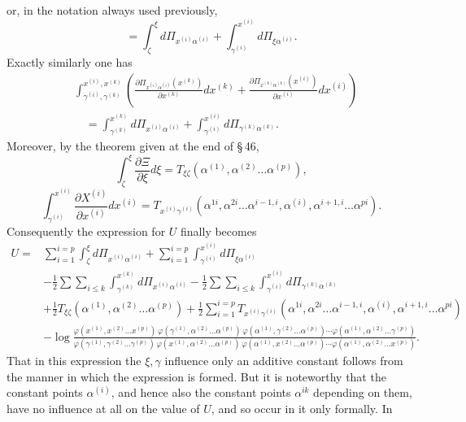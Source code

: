 \documentclass[10pt]{article}
\begin{document}
\endgroup
or, in the notation always used previously,
\[
=\int_{\zeta}^{\xi}d\Pi_{x^{(i)}\alpha^{(i)}}+
\int_{\gamma^{(i)}}^{x^{(i)}}d\Pi_{\xi\alpha^{(i)}}.
\]
Exactly similarly one has
\begingroup\footnotesize
\[
\begin{aligned}
&\int_{\gamma^{(i)},\gamma^{(k)}}^{x^{(i)},x^{(k)}}
\left(\frac{\partial\Pi_{x^{(i)}\alpha^{(i)}}(x^{(k)})}{\partial x^{(k)}}dx^{(k)}
+\frac{\partial\Pi_{x^{(k)}\alpha^{(k)}}(x^{(i)})}{\partial x^{(i)}}dx^{(i)}\right)\\
&\quad=\int_{\gamma^{(k)}}^{x^{(k)}}d\Pi_{x^{(i)}\alpha^{(i)}}+
\int_{\gamma^{(i)}}^{x^{(i)}}d\Pi_{\gamma^{(k)}\alpha^{(k)}}.
\end{aligned}
\]
\endgroup
Moreover, by the theorem given at the end of \S\,46,
\[
\int_{\zeta}^{\xi}\frac{\partial\Xi}{\partial\xi}d\xi
=T_{\xi\zeta}(\alpha^{(1)},\alpha^{(2)}\ldots\alpha^{(p)}),
\]
\[
\int_{\gamma^{(i)}}^{x^{(i)}}\frac{\partial X^{(i)}}{\partial x^{(i)}}dx^{(i)}
=T_{x^{(i)}\gamma^{(i)}}(\alpha^{1i},\alpha^{2i}\ldots\alpha^{i-1,i},\alpha^{(i)},\alpha^{i+1,i}\ldots\alpha^{pi}).
\]
Consequently the expression for \(U\) finally becomes
\begingroup\scriptsize
\[
\begin{aligned}
U={}&\sum_{i=1}^{i=p}\int_{\zeta}^{\xi}d\Pi_{x^{(i)}\alpha^{(i)}}
+\sum_{i=1}^{i=p}\int_{\gamma^{(i)}}^{x^{(i)}}d\Pi_{\xi\alpha^{(i)}}\\
&-\frac12\sum\sum_{i\le k}\int_{\gamma^{(k)}}^{x^{(k)}}d\Pi_{x^{(i)}\alpha^{(i)}}
-\frac12\sum\sum_{i\le k}\int_{\gamma^{(i)}}^{x^{(i)}}d\Pi_{\gamma^{(k)}\alpha^{(k)}}\\
&+\frac12T_{\xi\zeta}(\alpha^{(1)},\alpha^{(2)}\ldots\alpha^{(p)})
+\frac12\sum_{i=1}^{i=p}T_{x^{(i)}\gamma^{(i)}}(\alpha^{1i},\alpha^{2i}\ldots\alpha^{i-1,i},\alpha^{(i)},\alpha^{i+1,i}\ldots\alpha^{pi})\\
&-\log\frac{\varphi(x^{(1)},x^{(2)}\ldots x^{(p)})\,\varphi(\gamma^{(1)},\alpha^{(2)}\ldots\alpha^{(p)})\,\varphi(\alpha^{(1)},\gamma^{(2)}\ldots\alpha^{(p)})\cdots\varphi(\alpha^{(1)},\alpha^{(2)}\ldots\gamma^{(p)})}
{\varphi(\gamma^{(1)},\gamma^{(2)}\ldots\gamma^{(p)})\,\varphi(x^{(1)},\alpha^{(2)}\ldots\alpha^{(p)})\,\varphi(\alpha^{(1)},x^{(2)}\ldots\alpha^{(p)})\cdots\varphi(\alpha^{(1)},\alpha^{(2)}\ldots x^{(p)})}.
\end{aligned}
\]
\endgroup
That in this expression the \(\xi,\gamma\) influence only an additive constant follows from the manner in which the expression is formed. But it is noteworthy that the constant points \(\alpha^{(i)}\), and hence also the constant points \(\alpha^{ik}\) depending on them, have no influence at all on the value of \(U\), and so occur in it only formally. In
\end{document}
